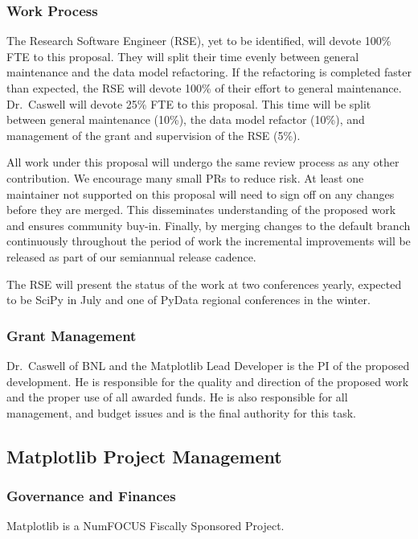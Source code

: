 \documentclass[12pt]{article}
\numberwithin{page}{section}
\begin{document}
\subsubsection{Work Process}

The Research Software Engineer (RSE), yet to be identified,
will devote 100\% FTE to this proposal.  They will split their time
evenly between general maintenance and the data model refactoring.  If
the refactoring is completed faster than expected, the RSE will devote
100\% of their effort to general maintenance.  Dr.\ Caswell will
devote 25\% FTE to this proposal.  This time will be split between
general maintenance (10\%), the data model refactor (10\%), and
management of the grant and supervision of the RSE (5\%).

All work under this proposal will undergo the same review process
as any other contribution.  We
encourage many small PRs to reduce risk.  At least one maintainer not
supported on this proposal
will need to sign off on any changes before they are merged. This
disseminates understanding of the proposed work and ensures
community buy-in.  Finally, by merging
changes to the default branch continuously throughout the period of
work the incremental improvements will be released as part of our
semiannual release cadence.

The RSE will present the status of the work at two conferences yearly,
expected to be SciPy in July and one of PyData regional conferences in
the winter.


\subsubsection{Grant Management}

Dr.\ Caswell of BNL and the Matplotlib Lead Developer is the PI of the
proposed development.  He is responsible for the quality and
direction of the proposed work and the proper use of all awarded
funds.  He is also responsible for all management, and budget issues
and is the final authority for this task.


\subsection{Matplotlib Project Management}
\subsubsection{Governance and Finances}

Matplotlib is a NumFOCUS Fiscally Sponsored Project.
\end{document}
